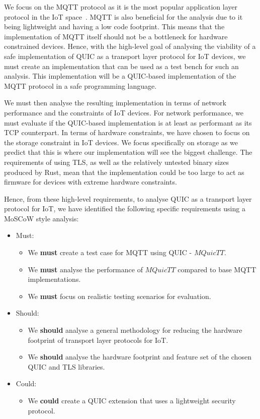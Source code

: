 We focus on the MQTT protocol as it is the most popular application layer protocol in the IoT space~\citep{tmobile_iot}.
MQTT is also beneficial for the analysis due to it being lightweight and having a low code footprint.
This means that the implementation of MQTT itself should not be a bottleneck for hardware constrained devices.
Hence, with the high-level goal of analysing the viability of a safe implementation of QUIC as a transport layer protocol for IoT devices, we must create an implementation that can be used as a test bench for such an analysis.
This implementation will be a QUIC-based implementation of the MQTT protocol in a safe programming language.

We must then analyse the resulting implementation in terms of network performance and the constraints of IoT devices.
For network performance, we must evaluate if the QUIC-based implementation is at least as performant as its TCP counterpart.
In terms of hardware constraints, we have chosen to focus on the storage constraint in IoT devices.
We focus specifically on storage as we predict that this is where our implementation will see the biggest challenge.
The requirements of using TLS, as well as the relatively untested binary sizes produced by Rust, mean that the implementation could be too large to act as firmware for devices with extreme hardware constraints.

Hence, from these high-level requirements, to analyse QUIC as a transport layer protocol for IoT, we have identified the following specific requirements using a MoSCoW style analysis:

\begin{itemize}
    \item Must:
    \begin{itemize}
        \item We \textbf{must} create a test case for MQTT using QUIC - $MQuicTT$.
        \item We \textbf{must} analyse the performance of $MQuicTT$ compared to base MQTT implementations.
        \item We \textbf{must} focus on realistic testing scenarios for evaluation.
    \end{itemize}
    \item Should:
    \begin{itemize}
        \item We \textbf{should} analyse a general methodology for reducing the hardware footprint of transport layer protocols for IoT.
        \item We \textbf{should} analyse the hardware footprint and feature set of the chosen QUIC and TLS libraries.
    \end{itemize}
    \item Could:
    \begin{itemize}
        \item We \textbf{could} create a QUIC extension that uses a lightweight security protocol.
    \end{itemize}
\end{itemize}

